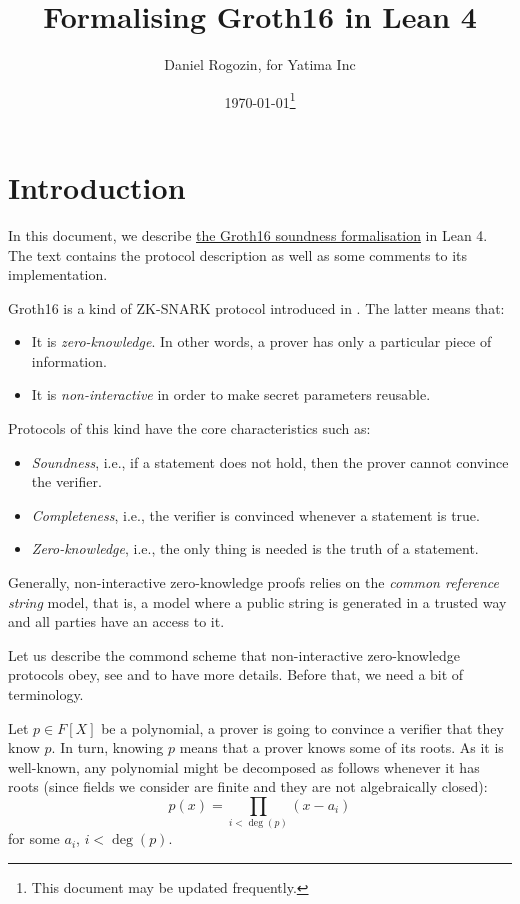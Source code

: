\documentclass{article}
\title{Formalising Groth16 in Lean 4}
\author{Daniel Rogozin, for Yatima Inc}
\date{\today\footnote{This document may be updated frequently.}}
\theoremstyle{definition}
\theoremstyle{remark}
\begin{document}
\maketitle

\section{Introduction}

In this document, we describe \href{https://github.com/yatima-inc/ZKSnark.lean/blob/main/ZkSNARK/Groth16/KnowledgeSoundness.lean}{the Groth16 soundness formalisation} in Lean 4.
The text contains the protocol description as well as some comments to its implementation.

Groth16 is a kind of ZK-SNARK protocol introduced in \cite{groth2016size}. The latter means that:

\begin{itemize}
\item It is \emph{zero-knowledge}. In other words, a prover has only a particular piece of information.
\item It is \emph{non-interactive} in order to make secret parameters reusable.
\end{itemize}

Protocols of this kind have the core characteristics such as:
\begin{itemize}
\item \emph{Soundness}, i.e., if a statement does not hold, then the prover cannot convince the verifier.
\item \emph{Completeness}, i.e., the verifier is convinced whenever a statement is true.
\item \emph{Zero-knowledge}, i.e., the only thing is needed is the truth of a statement.
\end{itemize}

Generally, non-interactive zero-knowledge proofs relies on the \emph{common reference string} model, that is, a model where a public string is generated in a trusted way and all parties have an access to it.

Let us describe the commond scheme that non-interactive zero-knowledge protocols obey, see \cite{petkus2019and} and \cite{bitansky2012extractable} to have more details. Before that, we need a bit of terminology.

Let $p \in F[X]$ be a polynomial, a prover is going to convince a verifier that they know $p$. In turn, knowing $p$ means that a prover knows some of its roots. As it is well-known, any polynomial might be decomposed as follows whenever it has roots (since fields we consider are finite and they are not algebraically closed):
\begin{equation}
p(x) = \prod_{i < \deg(p)} (x - a_i)
\end{equation}
for some $a_i$, $i < \deg(p)$.
\end{document}
